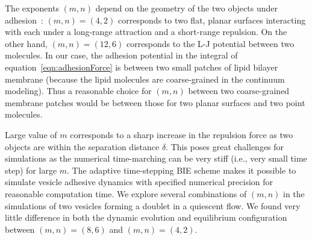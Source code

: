 \documentclass[prf,superscriptaddress,showpacs]{revtex4-1}
\begin{document}
The exponents $(m,n)$ depend on the geometry of the two objects under
adhesion~\cite{Book_IntermolecularSurfaceForces}: $(m,n)=(4,2)$
corresponds to two flat, planar surfaces interacting with each under a
long-range attraction and a short-range repulsion. On the other hand,
$(m,n) = (12,6)$ corresponds to the L-J potential between two molecules.
In our case,  the adhesion potential in  the integral of
equation~\eqref{eqn:adhesionForce} is between two small patches of lipid
bilayer membrane (because the lipid molecules are coarse-grained in the continuum modeling).
Thus a reasonable choice for $(m,n)$ between two coarse-grained membrane patches
 would be between those for two planar surfaces and two point molecules. 
 
 Large value of $m$ corresponds to a sharp increase in the repulsion force as two objects are within the separation distance $\delta$.
 This poses great challenges for simulations as the numerical time-marching can be very stiff (i.e., very small time step) for large $m$. 
 The adaptive time-stepping BIE scheme makes it possible to simulate vesicle adhesive dynamics with specified numerical precision for reasonable computation time.
 We explore several combinations of $(m,n)$ in the simulations 
 of two vesicles forming a doublet in a quiescent flow.
 We found very little difference in both the dynamic evolution and equilibrium configuration between $(m,n)=(8,6)$ and $(m,n)=(4,2)$.
 
 

 
%


\end{document}

